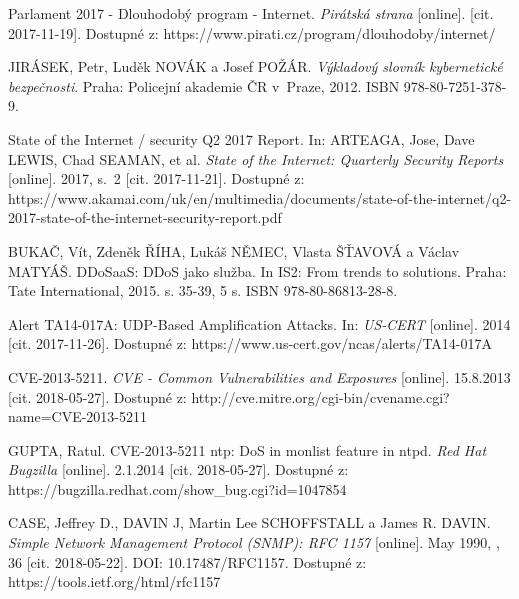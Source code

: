 

\begin{literatura}{99}

Parlament 2017 - Dlouhodobý program - Internet. \textit{Pirátská strana} [online]. [cit. 2017-11-19]. Dostupné z: https://www.pirati.cz/program/dlouhodoby/internet/

JIRÁSEK, Petr, Luděk NOVÁK a Josef POŽÁR. \textit{Výkladový slovník kybernetické bezpečnosti}. Praha: Policejní akademie ČR v~Praze, 2012. ISBN 978-80-7251-378-9.

State of the Internet / security Q2 2017 Report. In: ARTEAGA, Jose, Dave LEWIS, Chad SEAMAN, et al. \textit{State of the Internet: Quarterly Security Reports} [online]. 2017, s.~2 [cit. 2017-11-21]. Dostupné z: https://www.akamai.com/uk/en/multimedia/documents/state-of-the-internet/q2-2017-state-of-the-internet-security-report.pdf

BUKAČ, Vít, Zdeněk ŘÍHA, Lukáš NĚMEC, Vlasta ŠŤAVOVÁ a Václav MATYÁŠ. DDoSaaS: DDoS jako služba. In IS2: From trends to solutions. Praha: Tate International, 2015. s. 35-39, 5 s. ISBN 978-80-86813-28-8.

Alert TA14-017A: UDP-Based Amplification Attacks. In: \textit{US-CERT} [online]. 2014 [cit. 2017-11-26]. Dostupné z: https://www.us-cert.gov/ncas/alerts/TA14-017A

CVE-2013-5211. \textit{CVE - Common Vulnerabilities and Exposures} [online]. 15.8.2013 [cit. 2018-05-27]. Dostupné z: http://cve.mitre.org/cgi-bin/cvename.cgi?name=CVE-2013-5211

GUPTA, Ratul. CVE-2013-5211 ntp: DoS in monlist feature in ntpd. \textit{Red Hat Bugzilla} [online]. 2.1.2014 [cit. 2018-05-27]. Dostupné z: https://bugzilla.redhat.com/show\_bug.cgi?id=1047854

CASE, Jeffrey D., DAVIN J, Martin Lee SCHOFFSTALL a James R. DAVIN. \textit{Simple Network Management Protocol (SNMP): RFC 1157} [online]. May 1990, , 36 [cit. 2018-05-22]. DOI: 10.17487/RFC1157. Dostupné z: https://tools.ietf.org/html/rfc1157


\end{literatura}
